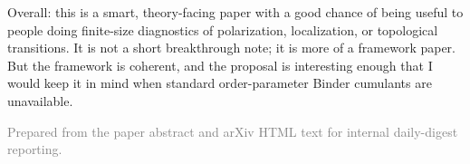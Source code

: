 \documentclass[11pt]{article}
\begin{document}
Overall: this is a smart, theory-facing paper with a good chance of being useful to people doing finite-size diagnostics of polarization, localization, or topological transitions. It is not a short breakthrough note; it is more of a framework paper. But the framework is coherent, and the proposal is interesting enough that I would keep it in mind when standard order-parameter Binder cumulants are unavailable.

\vfill
\textcolor{gray}{Prepared from the paper abstract and arXiv HTML text for internal daily-digest reporting.}
\end{document}
